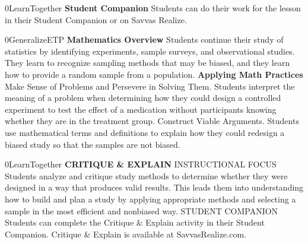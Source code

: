 \documentclass{article}
\newenvironment{te-addendum}[2]{}{}     %
\newcommand{\placeholder}[2]{}          %
\begin{document}
\begin{te-addendum}{0}{LearnTogether}
\textbf{Student Companion}
Students can do their work for the lesson in their Student Companion or on Savvas Realize.
\placeholder{illustration}{Student Companion cover: enVision Algebra 2, SAVVAS; purple glowing sphere on black.}
\end{te-addendum}
\begin{te-addendum}{0}{GeneralizeETP}
\textbf{Mathematics Overview}
Students continue their study of statistics by identifying experiments, sample surveys, and observational studies. They learn to recognize sampling methods that may be biased, and they learn how to provide a random sample from a population.
\textbf{Applying Math Practices}
Make Sense of Problems and Persevere in Solving Them. Students interpret the meaning of a problem when determining how they could design a controlled experiment to test the effect of a medication without participants knowing whether they are in the treatment group.
Construct Viable Arguments. Students use mathematical terms and definitions to explain how they could redesign a biased study so that the samples are not biased.
\end{te-addendum}
\begin{te-addendum}{0}{LearnTogether}
\textbf{CRITIQUE \& EXPLAIN}
INSTRUCTIONAL FOCUS Students analyze and critique study methods to determine whether they were designed in a way that produces valid results. This leads them into understanding how to build and plan a study by applying appropriate methods and selecting a sample in the most efficient and nonbiased way.
STUDENT COMPANION Students can complete the Critique \& Explain activity in their Student Companion.
Critique \& Explain is available at SavvasRealize.com.
\end{te-addendum}
\end{document}
